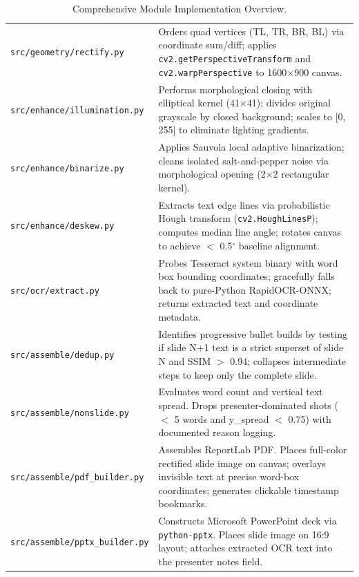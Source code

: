 \documentclass[10pt,a4paper]{article}
\begin{document}
\begin{table}[h!]
\begin{tabularx}{\textwidth}{@{} p{44mm} X @{}}
\texttt{src/geometry/rectify.py} & Orders quad vertices (TL, TR, BR, BL) via coordinate sum/diff; applies \texttt{cv2.getPerspectiveTransform} and \texttt{cv2.warpPerspective} to 1600$\times$900 canvas. \\
\texttt{src/enhance/illumination.py} & Performs morphological closing with elliptical kernel (41$\times$41); divides original grayscale by closed background; scales to [0, 255] to eliminate lighting gradients. \\
\texttt{src/enhance/binarize.py} & Applies Sauvola local adaptive binarization; cleans isolated salt-and-pepper noise via morphological opening (2$\times$2 rectangular kernel). \\
\texttt{src/enhance/deskew.py} & Extracts text edge lines via probabilistic Hough transform (\texttt{cv2.HoughLinesP}); computes median line angle; rotates canvas to achieve $<$ 0.5$^\circ$ baseline alignment. \\
\texttt{src/ocr/extract.py} & Probes Tesseract system binary with word box bounding coordinates; gracefully falls back to pure-Python RapidOCR-ONNX; returns extracted text and coordinate metadata. \\
\texttt{src/assemble/dedup.py} & Identifies progressive bullet builds by testing if slide N+1 text is a strict superset of slide N and SSIM $>$ 0.94; collapses intermediate steps to keep only the complete slide. \\
\texttt{src/assemble/nonslide.py} & Evaluates word count and vertical text spread. Drops presenter-dominated shots ($<$ 5 words and y\_spread $<$ 0.75) with documented reason logging. \\
\texttt{src/assemble/pdf\_builder.py} & Assembles ReportLab PDF. Places full-color rectified slide image on canvas; overlays invisible text at precise word-box coordinates; generates clickable timestamp bookmarks. \\
\texttt{src/assemble/pptx\_builder.py} & Constructs Microsoft PowerPoint deck via \texttt{python-pptx}. Places slide image on 16:9 layout; attaches extracted OCR text into the presenter notes field. \\
\bottomrule
\end{tabularx}
\caption{Comprehensive Module Implementation Overview.}
\end{table}

\newpage

\end{document}

